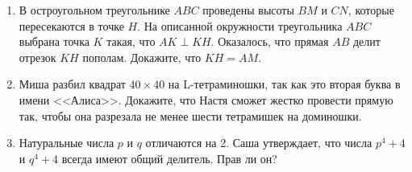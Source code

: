 \documentclass{article}
\begin{document}
\begin{enumerate}[label*=\arabic{enumi}.]

        \item В остроугольном треугольнике $ABC$ проведены высоты $BM$ и $CN$, которые пересекаются в точке $H$.
        На описанной окружности треугольника $ABC$ выбрана точка $K$ такая, что $AK \perp KH$.
        Оказалось, что прямая $AB$ делит отрезок $KH$ пополам.
        Докажите, что $KH =AM$.

        \item Миша разбил квадрат $40 \times 40$ на L-тетраминошки, так как это вторая буква в имени <<Алиса>>.
        Докажите, что Настя сможет жестко провести прямую так, чтобы она разрезала не менее шести тетрамишек на доминошки.

        \item Натуральные числа $p$ и $q$ отличаются на 2.
        Саша утверждает, что числа $p^4 + 4$ и $q^4 + 4$ всегда имеют общий делитель.
        Прав ли он?


    \end{enumerate}
\end{document}
